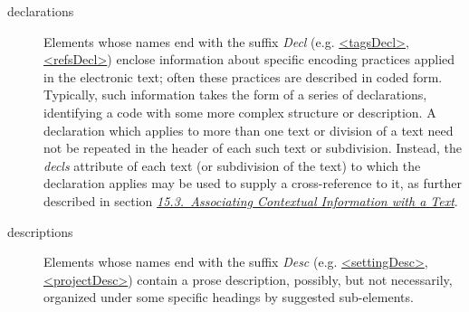 \begin{description}
\item[{declarations}]Elements whose names end with the suffix \textit{Decl} (e.g. \hyperref[TEI.tagsDecl]{<tagsDecl>}, \hyperref[TEI.refsDecl]{<refsDecl>}) enclose information about specific encoding practices applied in the electronic text; often these practices are described in coded form. Typically, such information takes the form of a series of declarations, identifying a code with some more complex structure or description. A declaration which applies to more than one text or division of a text need not be repeated in the header of each such text or subdivision. Instead, the {\itshape decls} attribute of each text (or subdivision of the text) to which the declaration applies may be used to supply a cross-reference to it, as further described in section \textit{\hyperref[CCAS]{15.3.\ Associating Contextual Information with a Text}}.
\item[{descriptions}]Elements whose names end with the suffix \textit{Desc} (e.g. \hyperref[TEI.settingDesc]{<settingDesc>}, \hyperref[TEI.projectDesc]{<projectDesc>}) contain a prose description, possibly, but not necessarily, organized under some specific headings by suggested sub-elements.
\end{description} 
